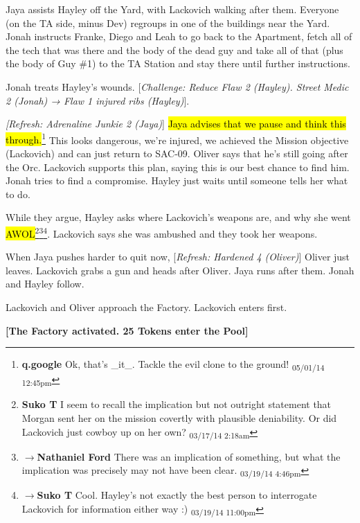 Jaya assists Hayley off the Yard, with Lackovich walking after them.  Everyone (on the TA side, minus Dev) regroups in one of the buildings near the Yard.  Jonah instructs Franke, Diego and Leah to go back to the Apartment, fetch all of the tech that was there and the body of the dead guy and take all of that (plus the body of Guy \#1) to the TA Station and stay there until further instructions.



Jonah treats Hayley's wounds. {[}\textit{Challenge: Reduce Flaw 2 (Hayley).  Street Medic 2 (Jonah) → Flaw 1 injured ribs (Hayley)}{]}. 



\textit{{[}Refresh: Adrenaline Junkie 2 (Jaya)}{]} \hl{Jaya advises that we pause and think this through.}\footnote{\textbf{q.google }Ok, that's \_it\_.  Tackle the evil clone to the ground! \textsubscript{05/01/14 12:45pm}}  This looks dangerous, we're injured, we achieved the Mission objective (Lackovich) and can just return to SAC-09.  Oliver says that he's still going after the Orc.  Lackovich supports this plan, saying this is our best chance to find him.  Jonah tries to find a compromise.  Hayley just waits until someone tells her what to do.



While they argue, Hayley asks where Lackovich's weapons are, and why she went \hl{AWOL}\footnote{\textbf{Suko T }I seem to recall the implication but not outright statement that Morgan sent her on the mission covertly with plausible deniability.  Or did Lackovich just cowboy up on her own? \textsubscript{03/17/14 2:18am}}\footnote{$\rightarrow$\textbf{Nathaniel Ford }There was an implication of something, but what the implication was precisely may not have been clear. \textsubscript{03/19/14 4:46pm}}\footnote{$\rightarrow$\textbf{Suko T }Cool.  Hayley's not exactly the best person to interrogate Lackovich for information either way :) \textsubscript{03/19/14 11:00pm}}.  Lackovich says she was ambushed and they took her weapons.



When Jaya pushes harder to quit now, {[}\textit{Refresh: Hardened 4 (Oliver)}{]}  Oliver just leaves.  Lackovich grabs a gun and heads after Oliver.  Jaya runs after them.  Jonah and Hayley follow.



Lackovich and Oliver approach the Factory.  Lackovich enters first.



\textbf{{[}The Factory activated.  25 Tokens enter the Pool{]}}



